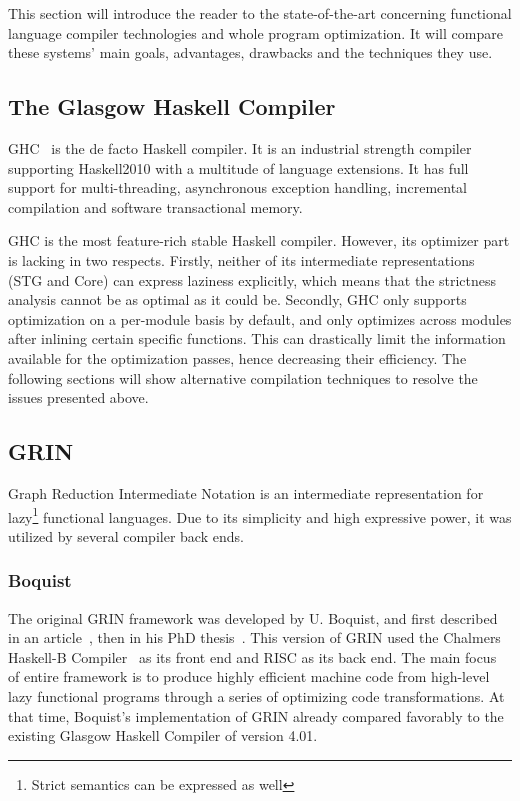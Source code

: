 \documentclass[main.tex]{subfiles}
\begin{document}
	
	This section will introduce the reader to the state-of-the-art concerning functional language compiler technologies and whole program optimization. It will compare these systems' main goals, advantages, drawbacks and the techniques they use.
	
	\subsection{The Glasgow Haskell Compiler}

	GHC~\cite{ghc} is the de facto Haskell compiler. It is an industrial strength compiler supporting Haskell2010 with a multitude of language extensions. It has full support for multi-threading, asynchronous exception handling, incremental compilation and software transactional memory.
	
	GHC is the most feature-rich stable Haskell compiler. However, its optimizer part is lacking in two respects. Firstly, neither of its intermediate representations (STG and Core) can express laziness explicitly, which means that the strictness analysis cannot be as optimal as it could be. Secondly, GHC only supports optimization on a per-module basis by default, and only optimizes across modules after inlining certain specific functions. This can drastically limit the information available for the optimization passes, hence decreasing their efficiency. The following sections will show alternative compilation techniques to resolve the issues presented above.
	
	\subsection{GRIN}
	
	Graph Reduction Intermediate Notation is an intermediate representation for lazy\footnote{Strict semantics can be expressed as well} functional languages. Due to its simplicity and high expressive power, it was utilized by several compiler back ends.
	
	\subsubsection{Boquist}
	
	The original GRIN framework was developed by U. Boquist, and first described in an article~\cite{boquist-grin}, then in his PhD thesis~\cite{boquist-phd}. This version of GRIN used the Chalmers Haskell-B Compiler~\cite{hbc} as its front end and RISC as its back end. The main focus of entire framework is to produce highly efficient machine code from high-level lazy functional programs through a series of optimizing code transformations. At that time, Boquist's implementation of GRIN already compared favorably to the existing Glasgow Haskell Compiler of version 4.01.
	
\end{document}
